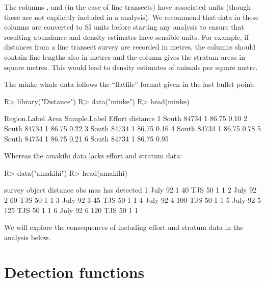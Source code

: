 \documentclass[article]{jss}\usepackage[]{graphicx}\usepackage[]{color}
\begin{document}
The columns ,  and (in the case of line transects)  have associated units (though these are not explicitly included in a  analysis). We recommend that data in these columns are converted to SI units before starting any analysis to ensure that resulting abundance and density estimates have sensible units. For example, if distances from a line transect survey are recorded in metres, the  columns should contain line lengths also in metres and the  column gives the stratum areas in square metres. This would lead to density estimates of animals per square metre.

The minke whale data follows the ``flatfile'' format given in the last bullet point:
\begin{Schunk}
\begin{Sinput}
R> library("Distance")
R> data("minke")
R> head(minke)
\end{Sinput}
\begin{Soutput}
  Region.Label  Area Sample.Label Effort distance
1        South 84734            1  86.75     0.10
2        South 84734            1  86.75     0.22
3        South 84734            1  86.75     0.16
4        South 84734            1  86.75     0.78
5        South 84734            1  86.75     0.21
6        South 84734            1  86.75     0.95
\end{Soutput}
\end{Schunk}
Whereas the amakihi data lacks effort and stratum data:
\begin{Schunk}
\begin{Sinput}
R> data("amakihi")
R> head(amakihi)
\end{Sinput}
\begin{Soutput}
   survey object distance obs mas has detected
1 July 92      1       40 TJS  50   1        1
2 July 92      2       60 TJS  50   1        1
3 July 92      3       45 TJS  50   1        1
4 July 92      4      100 TJS  50   1        1
5 July 92      5      125 TJS  50   1        1
6 July 92      6      120 TJS  50   1        1
\end{Soutput}
\end{Schunk}

We will explore the consequences of including effort and stratum data in the analysis below.

\section{Detection functions}
\end{document}
